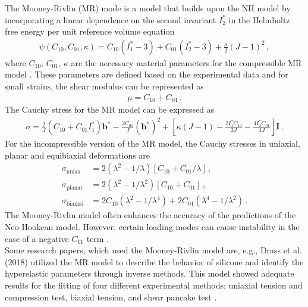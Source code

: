 The Mooney-Rivlin (MR) mode is a model that builds upon the NH model by incorporating a linear dependence on the 
second invariant $I_2^*$ in the Helmholtz free energy per unit reference volume equation 
\begin{align}
        \psi(C_{10}, C_{01}, \kappa) = C_{10}(I_1^* - 3) + C_{01}(I_2^* - 3) + \frac{\kappa}{2}(J-1)^2 \, ,
        \label{eq:helmholtzMR}
\end{align}
where $C_{10}$, $C_{01}$, $\kappa$ are the necessary material parameters for the compressible MR model \cite{Bergström2015}.
These parameters are defined based on the experimental data and for small strains, the shear modulus can be represented as \cite{Youssef2022}
\begin{align}
        \mu = C_{10} + C_{01} \, .
        \label{eq:constantsMR}
\end{align}
The Cauchy stress for the MR model can be expressed as 
\begin{align}
        \sigma = \frac{2}{J}(C_{10} + C_{01}I_1^*)\boldsymbol{b}^* - \frac{2C_{01}}{J}(\boldsymbol{b}^*)^2 + [\kappa(J-1) - \frac{2I_1^* C_{10}}{3J} - \frac{4I_2^* C_{01}}{3J}]\boldsymbol{I} \, .
        \label{eq:cauchystressMR}
\end{align}
For the incompressible version of the MR model, the Cauchy stresses in uniaxial, planar and equibiaxial deformations are 
\begin{align}
        \sigma_{\text{uniax}} &= 2(\lambda^2 - 1/\lambda)[C_{10} + C_{01}/\lambda] \, , \label{eq:uniaxMR} \\
        \sigma_{\text{planar}} &= 2(\lambda^2 - 1/\lambda^2)[C_{10} + C_{01}] \, , \label{eq:planarMR} \\
        \sigma_{\text{biaxial}} &= 2C_{10}(\lambda^2 - 1/\lambda^4) + 2C_{01}(\lambda^4 - 1/\lambda^2) \, . \label{eq:biaxialMR}
\end{align}
The Mooney-Rivlin model often enhances the accuracy of the predictions of the Neo-Hookean model.
However, certain loading modes can cause instability in the case of a negative $C_{01}$ term \cite{Bergström2015}.\\

Some research papers, which used the Mooney-Rivlin model are, e.g., Drass et al. (2018) utilized the MR 
model to describe the behavior of silicone and identify the hyperelastic parameters through inverse methods. This model 
showed adequate results for the fitting of four different experimental methods; uniaxial tension and compression test, 
biaxial tension, and shear pancake test \cite{Drass2018}.

